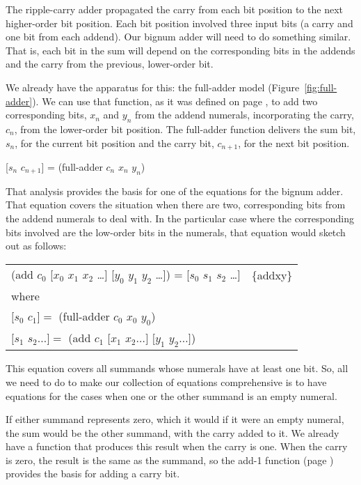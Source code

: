 The ripple-carry adder propagated the carry from each bit position
to the next higher-order bit position.
Each bit position involved three input bits
(a carry and one bit from each addend).
Our bignum adder will need to do something similar.
That is, each bit in the sum will depend on the
corresponding bits in the addends and the carry from
the previous, lower-order bit.

We already have the apparatus for this: the full-adder model
(Figure~\ref{fig:full-adder}).
We can use that function, as it was defined
on page \pageref{fig:full-adder},
to add two corresponding bits, $x_n$ and $y_n$ from the addend numerals,
incorporating the carry, $c_n$, from the lower-order bit position.
The full-adder function delivers the sum bit, $s_n$, for the current
bit position and the carry bit, $c_{n+1}$, for the next bit position.
\begin{center}
[$s_n$ $c_{n+1}$] = (full-adder $c_n$ $x_n$ $y_n$)
\end{center}

That analysis provides the basis for
one of the equations for the bignum adder.
That equation covers the situation when there are two,
corresponding bits from the addend numerals to deal with.
In the particular case where the corresponding bits involved
are the low-order bits in the numerals,
that equation would sketch out as follows:

\begin{tabular}{ll}
(add $c_0$ [$x_0$ $x_1$ $x_2$ \dots ] [$y_0$ $y_1$ $y_2$ \dots ]) = [$s_0$ $s_1$ $s_2$ \dots ]   & \{addxy\} \\
where & \\
$[s_0$ $c_1] =$ (full-adder $c_0$ $x_0$ $y_0$) & \\
$[s_1$ $s_2 \dots ] =$ (add $c_1$ $[x_1$ $x_2 \dots ]$ $[y_1$ $y_2 \dots ]$) & \\
\end{tabular}

This equation covers all summands whose numerals have at least one bit.
So, all we need to do to make our collection of equations comprehensive
is to have equations for the cases when one or the other summand is an empty numeral.

If either summand represents zero, which it would if it were an empty numeral,
the sum would be the other summand, with the carry added to it.
We already have a function that produces this result when the carry is one.
When the carry is zero, the result is the same as the summand,
so the add-1 function (page \pageref{add-1-defun}) provides the basis
for adding a carry bit.

